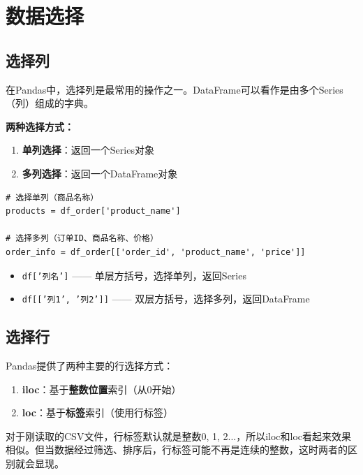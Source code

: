 \documentclass[12pt,a4paper]{article}
\begin{document}
\section{数据选择}

\subsection{选择列}

\begin{theorybox}[DataFrame的列选择]
在Pandas中，选择列是最常用的操作之一。DataFrame可以看作是由多个Series（列）组成的字典。

\textbf{两种选择方式：}
\begin{enumerate}
    \item \textbf{单列选择}：返回一个Series对象
    \item \textbf{多列选择}：返回一个DataFrame对象
\end{enumerate}
\end{theorybox}

\begin{lstlisting}[caption={选择单列和多列}]
# 选择单列（商品名称）
products = df_order['product_name']

# 选择多列（订单ID、商品名称、价格）
order_info = df_order[['order_id', 'product_name', 'price']]
\end{lstlisting}

\begin{tipbox}[注意方括号的区别]
\begin{itemize}
    \item \texttt{df['列名']} —— 单层方括号，选择单列，返回Series
    \item \texttt{df[['列1', '列2']]} —— 双层方括号，选择多列，返回DataFrame
\end{itemize}
\end{tipbox}

\subsection{选择行}

\begin{theorybox}[iloc和loc的区别]
Pandas提供了两种主要的行选择方式：

\begin{enumerate}
    \item \textbf{iloc}：基于\textbf{整数位置}索引（从0开始）
    \item \textbf{loc}：基于\textbf{标签}索引（使用行标签）
\end{enumerate}

对于刚读取的CSV文件，行标签默认就是整数0, 1, 2...，所以iloc和loc看起来效果相似。但当数据经过筛选、排序后，行标签可能不再是连续的整数，这时两者的区别就会显现。
\end{theorybox}
\end{document}
